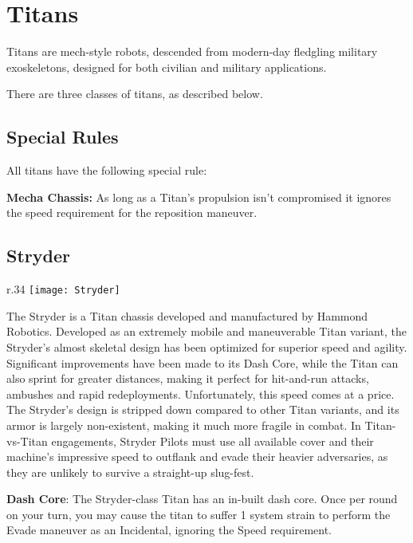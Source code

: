 \chapter{Titans}
\label{chap:titans}

Titans are mech-style robots, descended from modern-day fledgling military exoskeletons, designed for both civilian and military applications. 

There are three classes of titans, as described below.

\section{Special Rules}
\label{sec:specialrules}

All titans have the following special rule:

\textbf{Mecha Chassis:} As long as a Titan's propulsion isn't compromised it ignores the speed requirement for the reposition maneuver.

\section{Stryder}
\label{sec:stryder}
\begin{wrapfigure}[13]{r}{.34\linewidth}
\vspace*{-2em}
\texttt{[image: Stryder]}
\end{wrapfigure}


The Stryder is a Titan chassis developed and manufactured by Hammond Robotics. Developed as an extremely mobile and maneuverable Titan variant, the Stryder's almost skeletal design has been optimized for superior speed and agility. Significant improvements have been made to its Dash Core, while the Titan can also sprint for greater distances, making it perfect for hit-and-run attacks, ambushes and rapid redeployments. Unfortunately, this speed comes at a price. The Stryder's design is stripped down compared to other Titan variants, and its armor is largely non-existent, making it much more fragile in combat. In Titan-vs-Titan engagements, Stryder Pilots must use all available cover and their machine's impressive speed to outflank and evade their heavier adversaries, as they are unlikely to survive a straight-up slug-fest.

\textbf{Dash Core}: The Stryder-class Titan has an in-built dash core. Once per round on your turn, you may cause the titan to suffer 1 system strain to perform the Evade maneuver as an Incidental, ignoring the Speed requirement.

